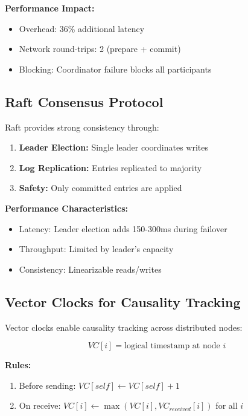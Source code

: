 \documentclass[11pt,a4paper]{article}
\begin{document}
\textbf{Performance Impact:}
\begin{itemize}
    \item Overhead: 36\% additional latency
    \item Network round-trips: 2 (prepare + commit)
    \item Blocking: Coordinator failure blocks all participants
\end{itemize}

\subsection{Raft Consensus Protocol}

Raft provides strong consistency through:
\begin{enumerate}
    \item \textbf{Leader Election:} Single leader coordinates writes
    \item \textbf{Log Replication:} Entries replicated to majority
    \item \textbf{Safety:} Only committed entries are applied
\end{enumerate}

\textbf{Performance Characteristics:}
\begin{itemize}
    \item Latency: Leader election adds 150-300ms during failover
    \item Throughput: Limited by leader's capacity
    \item Consistency: Linearizable reads/writes
\end{itemize}

\subsection{Vector Clocks for Causality Tracking}

Vector clocks enable causality tracking across distributed nodes:

\begin{equation}
VC[i] = \text{logical timestamp at node } i
\end{equation}

\textbf{Rules:}
\begin{enumerate}
    \item Before sending: $VC[self] \gets VC[self] + 1$
    \item On receive: $VC[i] \gets \max(VC[i], VC_{received}[i])$ for all $i$
\end{enumerate}
\end{document}
